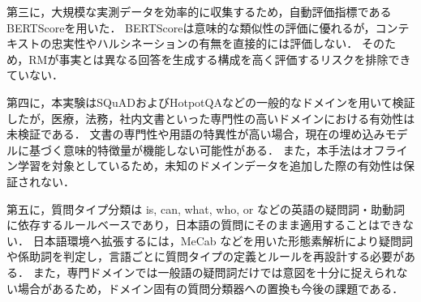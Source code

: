 第三に，大規模な実測データを効率的に収集するため，自動評価指標であるBERTScoreを用いた．
BERTScoreは意味的な類似性の評価に優れるが，コンテキストの忠実性やハルシネーションの有無を直接的には評価しない．
そのため，RMが事実とは異なる回答を生成する構成を高く評価するリスクを排除できていない．

第四に，本実験はSQuADおよびHotpotQAなどの一般的なドメインを用いて検証したが，医療，法務，社内文書といった専門性の高いドメインにおける有効性は未検証である．
文書の専門性や用語の特異性が高い場合，現在の埋め込みモデルに基づく意味的特徴量が機能しない可能性がある．
また，本手法はオフライン学習を対象としているため，未知のドメインデータを追加した際の有効性は保証されない．

第五に，質問タイプ分類は is, can, what, who, or などの英語の疑問詞・助動詞に依存するルールベースであり，日本語の質問にそのまま適用することはできない．
日本語環境へ拡張するには，MeCab などを用いた形態素解析により疑問詞や係助詞を判定し，言語ごとに質問タイプの定義とルールを再設計する必要がある．
また，専門ドメインでは一般語の疑問詞だけでは意図を十分に捉えられない場合があるため，ドメイン固有の質問分類器への置換も今後の課題である．
